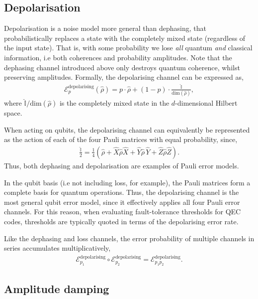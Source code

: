 \documentclass[aps,rmp,twocolumn,amsmath,amssymb,nofootinbib,superscriptaddress,longbibliography,floatfix]{revtex4-1}
\begin{document}
\subsection{Depolarisation}

Depolarisation is a noise model more general than dephasing, that probabilistically replaces a state with the completely mixed state (regardless of the input state). That is, with some probability we lose \emph{all} quantum \emph{and} classical information, i.e both coherences and probability amplitudes. Note that the dephasing channel introduced above only destroys quantum coherence, whilst preserving amplitudes. Formally, the depolarising channel can be expressed as,
\begin{align} \label{eq:depolarizing_channel}
\mathcal{E}^\mathrm{depolarising}_p(\hat\rho) = p \cdot \hat\rho + (1-p)\cdot \frac{\mathbb{\hat{I}}}{\mathrm{dim}(\hat\rho)},
\end{align}
where $\mathbb{\hat{I}}/\mathrm{dim}(\hat\rho)$ is the completely mixed state in the $d$-dimensional Hilbert space.

When acting on qubits, the depolarising channel can equivalently be represented as the action of each of the four Pauli matrices with equal probability, since,
\begin{align}
\frac{\mathbb{\hat{I}}}{2} = \frac{1}{4}(\hat\rho + \hat{X}\hat\rho\hat{X} + \hat{Y}\hat\rho\,\hat{Y} + \hat{Z}\hat\rho\hat{Z}).
\end{align}
Thus, both dephasing and depolarisation are examples of Pauli error models.

In the qubit basis (i.e not including loss, for example), the Pauli matrices form a complete basis for quantum operations. Thus, the depolarising channel is the most general qubit error model, since it effectively applies all four Pauli error channels. For this reason, when evaluating fault-tolerance thresholds for QEC codes, thresholds are typically quoted in terms of the depolarising error rate.

Like the dephasing and loss channels, the error probability of multiple channels in series accumulates multiplicatively,
\begin{align}
\mathcal{E}_{p_1}^\mathrm{depolarising} \circ \mathcal{E}_{p_2}^\mathrm{depolarising} = \mathcal{E}_{p_1 p_2}^\mathrm{depolarising}.
\end{align}

%
%

\subsection{Amplitude damping}
\end{document}
